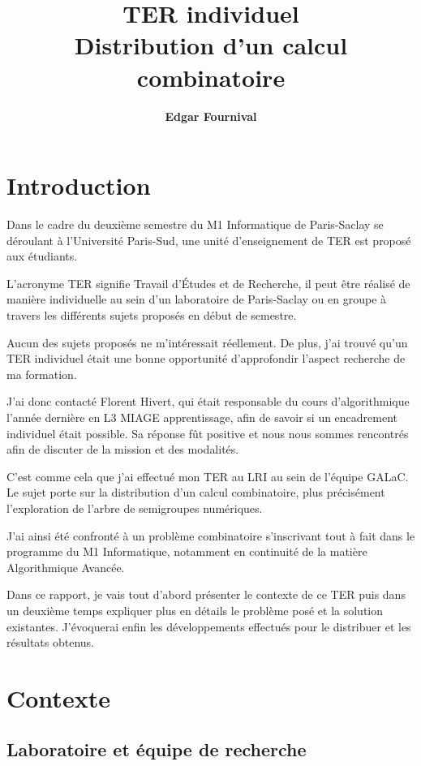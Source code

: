 \documentclass[12pt,a4paper]{report}
\title{\bfseries\LARGE TER individuel\\[0.5em]\Huge Distribution d'un calcul combinatoire}
\author{\bfseries\Large Edgar Fournival}
\date{}
\begin{document}
\maketitle

\tableofcontents

\chapter*{Introduction}

Dans le cadre du deuxième semestre du M1 Informatique de Paris-Saclay se déroulant à l'Université Paris-Sud, une unité d'enseignement de TER est proposé aux étudiants.

L'acronyme TER signifie Travail d'Études et de Recherche, il peut être réalisé de manière individuelle au sein d'un laboratoire de Paris-Saclay ou en groupe à travers les différents sujets proposés en début de semestre.

Aucun des sujets proposés ne m'intéressait réellement. De plus, j'ai trouvé qu'un TER individuel était une bonne opportunité d'approfondir l'aspect recherche de ma formation.

J'ai donc contacté Florent Hivert, qui était responsable du cours d'algorithmique l'année dernière en L3 MIAGE apprentissage, afin de savoir si un encadrement individuel était possible. Sa réponse fût positive et nous nous sommes rencontrés afin de discuter de la mission et des modalités.

C'est comme cela que j'ai effectué mon TER au LRI au sein de l'équipe GALaC. Le sujet porte sur la distribution d'un calcul combinatoire, plus précisément l'exploration de l'arbre de semigroupes numériques.

J'ai ainsi été confronté à un problème combinatoire s'inscrivant tout à fait dans le programme du M1 Informatique, notamment en continuité de la matière Algorithmique Avancée.

Dans ce rapport, je vais tout d'abord présenter le contexte de ce TER puis dans un deuxième temps expliquer plus en détails le problème posé et la solution existantes. J'évoquerai enfin les développements effectués pour le distribuer et les résultats obtenus.

\chapter{Contexte}

\section{Laboratoire et équipe de recherche}
\end{document}
